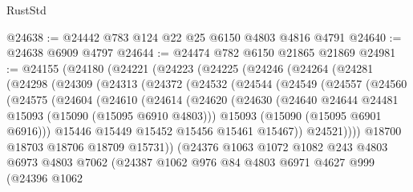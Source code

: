 \begin{lexlean}{RustStd}
\begin{coremodule}
@24638 := @24442 @783 @124 @22 @25 @6150 @4803 @4816 @4791
@24640 := @24638 @6909 @4797
@24644 := @24474 @782 @6150 @21865 @21869
@24981 := @24155
    (@24180
      (@24221
        (@24223
          (@24225
            (@24246
              (@24264
                (@24281
                  (@24298
                    (@24309
                      (@24313
                        (@24372
                          (@24532
                            (@24544
                              (@24549
                                (@24557
                                  (@24560
                                    (@24575
                                      (@24604
                                        (@24610
                                          (@24614
                                            (@24620
                                              (@24630
                                                (@24640
                                                  @24644
                                                  @24481
                                                  @15093
                                                  (@15090 (@15095 @6910 @4803)))
                                                @15093
                                                (@15090 (@15095 @6901 @6916)))
                                              @15446
                                              @15449
                                              @15452
                                              @15456
                                              @15461
                                              @15467))
                                          @24521))))
                                  @18700
                                  @18703
                                  @18706
                                  @18709
                                  @15731))
                              (@24376
                                @1063
                                @1072
                                @1082
                                @243
                                @4803
                                @6973
                                @4803
                                @7062
                                (@24387
                                  @1062
                                  @976
                                  @84
                                  @4803
                                  @6971
                                  @4627
                                  @999
                                  (@24396
                                    @1062

\end{coremodule}
\end{lexlean}
